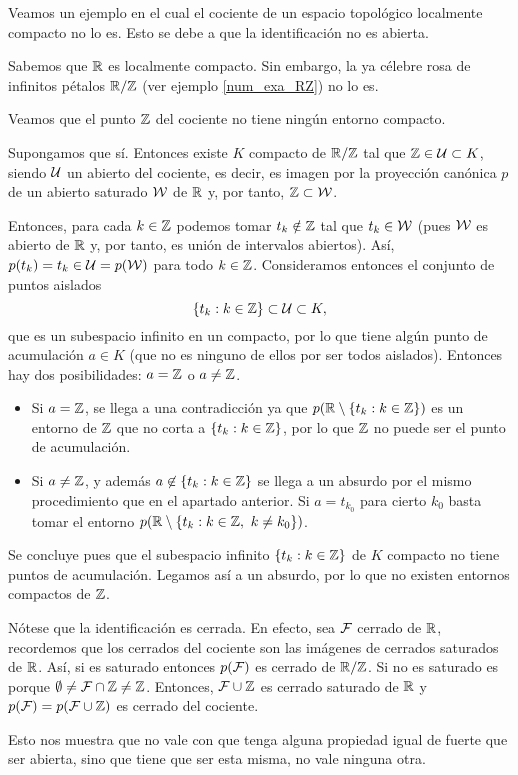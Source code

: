 \begin{exa}\label{comp_exa_RZ}
	Veamos un ejemplo en el cual el cociente de un espacio topológico localmente compacto no lo es. Esto se debe a que la identificación no es abierta.
	
	Sabemos que $\mathbb{R}$ es localmente compacto. Sin embargo, la ya célebre rosa de infinitos pétalos $\mathbb{R}/\mathbb{Z}$ (ver ejemplo \ref{num_exa_RZ}) no lo es.
	
	Veamos que el punto $\mathbb{Z}$ del cociente no tiene ningún entorno compacto.
	
	Supongamos que sí. Entonces existe $K$ compacto de $\mathbb{R}/\mathbb{Z}$ tal que $\mathbb{Z}\in\mathcal{U}\subset K$, siendo $\mathcal{U}$ un abierto del cociente, es decir, es imagen por la proyección canónica $p$ de un abierto saturado $\mathcal{W}$ de $\mathbb{R}$ y, por tanto, $\mathbb{Z}\subset\mathcal{W}$.
	
	Entonces, para cada $k\in\mathbb{Z}$ podemos tomar $t_k\notin\mathbb{Z}$ tal que $t_k\in\mathcal{W}$ (pues $\mathcal{W}$ es abierto de $\mathbb{R}$ y, por tanto, es unión de intervalos abiertos). Así, $p(t_k)=t_k\in\mathcal{U}=p(\mathcal{W})$ para todo $k\in\mathbb{Z}$. Consideramos entonces el conjunto de puntos aislados
	\[\{t_k : k\in\mathbb{Z}\}\subset\mathcal{U}\subset K,\]
	que es un subespacio infinito en un compacto, por lo que tiene algún punto de acumulación $a\in K$ (que no es ninguno de ellos por ser todos aislados). Entonces hay dos posibilidades: $a=\mathbb{Z}$ o $a\not=\mathbb{Z}$.
	\begin{itemize}
		\item Si $a=\mathbb{Z}$, se llega a una contradicción ya que  $p(\mathbb{R}\setminus\{t_k:k\in\mathbb{Z}\})$ es un entorno de $\mathbb{Z}$ que no corta a $\{t_k : k\in\mathbb{Z}\}$, por lo que $\mathbb{Z}$ no puede ser el punto de acumulación.
		\item Si $a\not=\mathbb{Z}$, y además $a\not\in\{t_k : k\in\mathbb{Z}\}$ se llega a un absurdo por el mismo procedimiento que en el apartado anterior. Si $a=t_{k_0}$ para cierto $k_0$ basta tomar el entorno $p(\R\setminus\{t_k:k\in\Z,\ k\not=k_0\})$.
	\end{itemize}
	Se concluye pues que el subespacio infinito $\{t_k : k\in\mathbb{Z}\}$ de $K$ compacto no tiene puntos de acumulación. Legamos así a un absurdo, por lo que no existen entornos compactos de $\mathbb{Z}$.
	
	Nótese que la identificación es cerrada. En efecto, sea $\mathcal{F}$ cerrado de $\mathbb{R}$, recordemos que los cerrados del cociente son las imágenes de cerrados saturados de $\mathbb{R}$. Así, si es saturado entonces $p(\mathcal{F})$ es cerrado de $\mathbb{R}/\mathbb{Z}$. Si no es saturado es porque $\emptyset\not=\mathcal{F}\cap\mathbb{Z}\not=\mathbb{Z}$. Entonces, $\mathcal{F}\cup\mathbb{Z}$ es cerrado saturado de $\mathbb{R}$ y $p(\mathcal{F})=p(\mathcal{F}\cup\mathbb{Z})$ es cerrado del cociente.
	
	Esto nos muestra que no vale con que tenga alguna propiedad igual de fuerte que ser abierta, sino que tiene que ser esta misma, no vale ninguna otra.
\end{exa}

